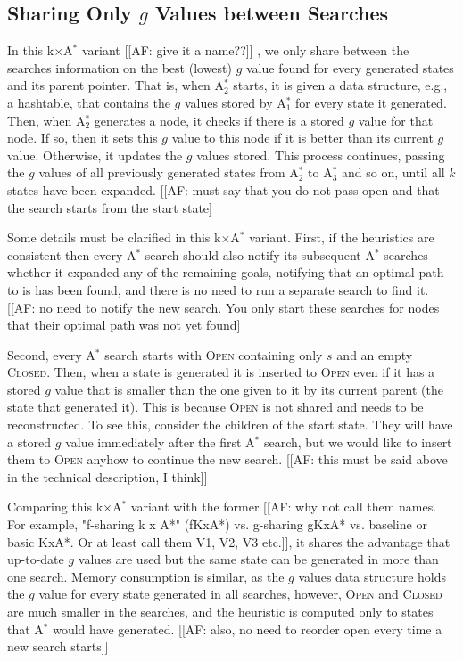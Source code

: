 \documentclass[twoside,11pt]{article}
\newcommand{\astar}{A$^*$\xspace}
\newcommand{\kxastar}{k$\times$A$^*$\xspace}
\newcommand{\astari}[1]{A$^*_{#1}$\xspace}
\newcommand{\open}{\textsc{Open}\xspace}
\newcommand{\closed}{\textsc{Closed}\xspace}
\begin{document}
\subsection{Sharing Only $g$ Values between Searches}
In this \kxastar variant [[AF: give it a name??]] , we only share between the searches information on the best (lowest) $g$ value found for every generated states and its parent pointer.
That is, when \astari{2} starts, it is given a data structure, e.g., a hashtable, that contains the $g$ values stored by \astari{1} for every state it generated.
Then, when \astari{2} generates a node, it checks if there is a stored $g$ value for that node.
If so, then it sets this $g$ value to this node if it is better than its current $g$ value.
Otherwise, it updates the $g$ values stored.
This process continues, passing the $g$ values of all previously generated states from \astari{2} to \astari{3} and so on, until all $k$ states have been expanded.  [[AF: must say that you do not pass open and that the search starts from the start state]

Some details must be clarified in this \kxastar variant.
First, if the heuristics are consistent then every \astar search should also notify its subsequent \astar searches whether it expanded any of the remaining goals, notifying that an optimal path to is has been found, and there is no need to run a separate search to find it. [[AF: no need to notify the new search. You only start these searches for nodes that their optimal path was not yet found]

Second, every \astar search starts with \open containing only $s$ and an empty \closed.
Then, when a state is generated it is inserted to \open even if it has a stored $g$ value that is smaller than the one given to it by its current parent (the state that generated it).
This is because \open is not shared and needs to be reconstructed.
To see this, consider the children of the start state.
They will have a stored $g$ value immediately after the first \astar search, but we would like to insert them to \open anyhow to continue the new search.  [[AF: this must be said above in the technical description, I think]]

Comparing this \kxastar variant with the former [[AF: why not call them names. For example, "f-sharing k x A*" (fKxA*) vs. g-sharing gKxA* vs. baseline or basic KxA*. Or at least call them V1, V2, V3 etc.]], it shares the advantage that up-to-date $g$ values are used but the same state can be generated in more than one search.
Memory consumption is similar, as the $g$ values data structure holds the $g$ value for every state generated in all searches, however, \open and \closed are much smaller in the searches, and the heuristic is computed only to states that \astar would have generated. [[AF: also, no need to reorder open every time a new search starts]]
\end{document}
